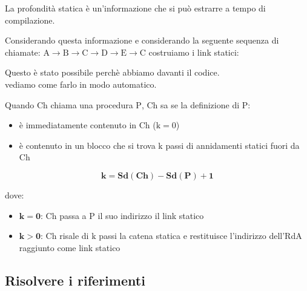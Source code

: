 La profondità statica è un'informazione che si può estrarre a tempo di compilazione.


Considerando questa informazione e considerando la seguente sequenza di chiamate: $\mathrm{A} \to \mathrm{B} \to \mathrm{C} \to \mathrm{D} \to \mathrm{E} \to \mathrm{C}$ costruiamo i link statici:


Questo è stato possibile perchè abbiamo davanti il codice.\\[0.2ex]
vediamo come farlo in modo automatico.


Quando $\mathrm{Ch}$ chiama una procedura $\mathrm{P}$, $\mathrm{Ch}$ sa se la definizione di $\mathrm{P}$:
\begin{itemize}[label=$\diamond$, itemsep=\smallskipamount]
    \item è immediatamente contenuto in $\mathrm{Ch}$ ($\mathrm{k = 0}$)
    \item è contenuto in un blocco che si trova $\mathrm{k}$ passi di annidamenti statici fuori da $\mathrm{Ch}$
\end{itemize}

\[
    \mathbf{k = Sd(Ch) - Sd(P) + 1}
\]

dove:
\begin{itemize}[label=$\triangleright$, itemsep=\smallskipamount]
    \item $\mathbf{k = 0}$: $\mathrm{Ch}$ passa a $\mathrm{P}$ il suo indirizzo il link statico
    \item $\mathbf{k > 0}$: $\mathrm{Ch}$ risale di $\mathrm{k}$ passi la catena statica e restituisce l'indirizzo dell'RdA raggiunto come link statico
\end{itemize}


\subsection{Risolvere i riferimenti}